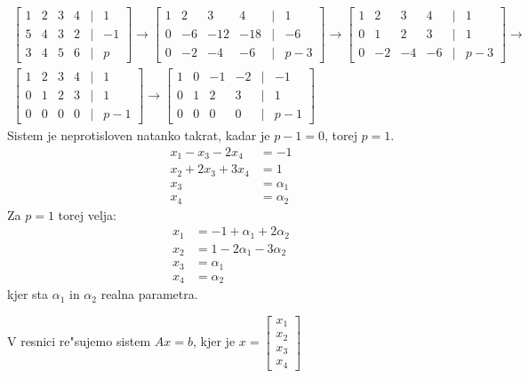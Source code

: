 \begin{gather*}
\begin{bmatrix}
1 & 2 & 3 & 4 & | & 1 \\
5 & 4 & 3 & 2 & | & -1 \\
3 & 4 & 5 & 6 & | & p
\end{bmatrix} \to
\begin{bmatrix}
1 & 2 & 3 & 4 & | & 1 \\
0 & -6 & -12 & -18 & | & -6 \\
0 & -2 & -4 & -6 & | & p-3
\end{bmatrix} \to
\begin{bmatrix}
1 & 2 & 3 & 4 & | & 1 \\
0 & 1 & 2 & 3 & | & 1 \\
0 & -2 & -4 & -6 & | & p-3
\end{bmatrix} \to \\
\begin{bmatrix}
1 & 2 & 3 & 4 & | & 1 \\
0 & 1 & 2 & 3 & | & 1 \\
0 & 0 & 0 & 0 & | & p - 1
\end{bmatrix} \to
\begin{bmatrix}
1 & 0 & -1 & -2 & | & -1 \\
0 & 1 & 2 & 3 & | & 1 \\
0 & 0 & 0 & 0 & | & p-1
\end{bmatrix}
\end{gather*}
Sistem je neprotisloven natanko takrat, kadar je $p-1 = 0$, torej $p=1$.
\begin{align*}
x_1 - x_3 - 2x_4 &= -1 \\
x_2 + 2x_3 + 3x_4 &= 1 \\
x_3 &= \alpha_1 \\
x_4 &= \alpha_2
\end{align*}
Za $p=1$ torej velja:
\begin{align*}
x_1 &= -1 + \alpha_1 + 2\alpha_2 \\
x_2 &= 1 - 2\alpha_1 - 3\alpha_2 \\
x_3 &= \alpha_1 \\
x_4 &= \alpha_2
\end{align*}
kjer sta $\alpha_1$ in $\alpha_2$ realna parametra.

V resnici re"sujemo sistem $Ax = b$, kjer je $x = \begin{bmatrix}x_1 \\ x_2 \\ x_3 \\ x_4\end{bmatrix}$

